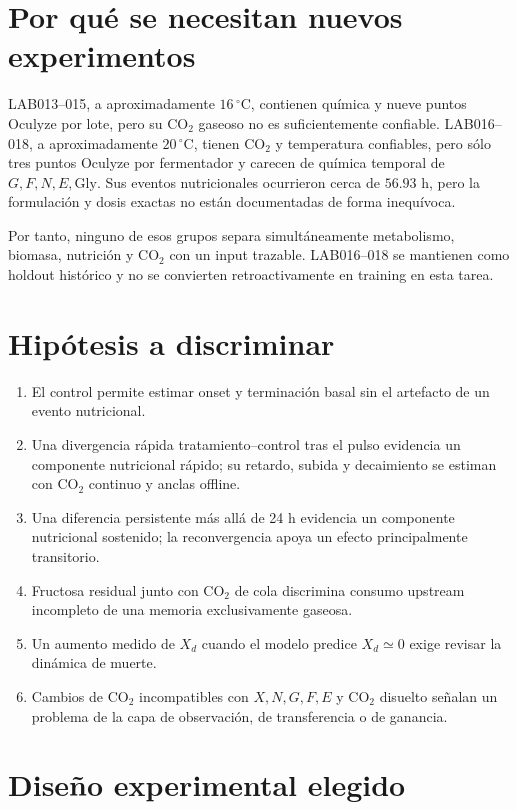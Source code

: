 \documentclass[11pt,a4paper]{article}
\begin{document}
\section{Por qué se necesitan nuevos experimentos}

LAB013--015, a aproximadamente \(16\,^{\circ}\mathrm{C}\), contienen química y
nueve puntos Oculyze por lote, pero su CO$_2$ gaseoso no es suficientemente
confiable. LAB016--018, a aproximadamente \(20\,^{\circ}\mathrm{C}\), tienen
CO$_2$ y temperatura confiables, pero sólo tres puntos Oculyze por fermentador y
carecen de química temporal de \(G,F,N,E,\mathrm{Gly}\). Sus eventos nutricionales
ocurrieron cerca de \(56.93\) h, pero la formulación y dosis exactas no están
documentadas de forma inequívoca.

Por tanto, ninguno de esos grupos separa simultáneamente metabolismo, biomasa,
nutrición y CO$_2$ con un input trazable. LAB016--018 se mantienen como holdout
histórico y no se convierten retroactivamente en training en esta tarea.

\section{Hipótesis a discriminar}

\begin{enumerate}[leftmargin=*]
  \item El control permite estimar onset y terminación basal sin el artefacto de
  un evento nutricional.
  \item Una divergencia rápida tratamiento--control tras el pulso evidencia un
  componente nutricional rápido; su retardo, subida y decaimiento se estiman con
  CO$_2$ continuo y anclas offline.
  \item Una diferencia persistente más allá de 24 h evidencia un componente
  nutricional sostenido; la reconvergencia apoya un efecto principalmente
  transitorio.
  \item Fructosa residual junto con CO$_2$ de cola discrimina consumo upstream
  incompleto de una memoria exclusivamente gaseosa.
  \item Un aumento medido de \(X_d\) cuando el modelo predice \(X_d\simeq0\)
  exige revisar la dinámica de muerte.
  \item Cambios de CO$_2$ incompatibles con \(X,N,G,F,E\) y CO$_2$ disuelto
  señalan un problema de la capa de observación, de transferencia o de ganancia.
\end{enumerate}

\section{Diseño experimental elegido}
\end{document}
